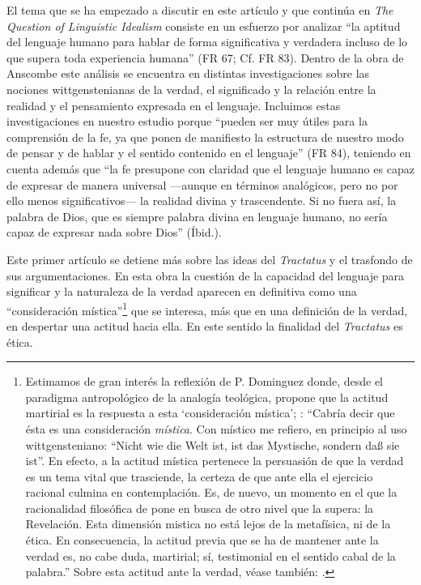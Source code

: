 El tema que se ha empezado a discutir en este artículo y que continúa en \emph{The Question of Linguistic Idealism} consiste en un esfuerzo por analizar \enquote{la aptitud del lenguaje humano para hablar de forma significativa y verdadera incluso de lo que supera toda experiencia humana} (FR 67; Cf. FR 83). Dentro de la obra de Anscombe este análisis se encuentra en distintas investigaciones sobre las nociones wittgenstenianas de la verdad, el significado y la relación entre la realidad y el pensamiento expresada en el lenguaje. 
Incluimos estas investigaciones en nuestro estudio porque \enquote{pueden ser muy útiles para la comprensión de la fe, ya que ponen de manifiesto la estructura de nuestro modo de pensar y de hablar y el sentido contenido en el lenguaje} (FR 84), teniendo en cuenta además que \enquote{la fe presupone con claridad que el lenguaje humano es capaz de expresar de manera universal ---aunque en términos analógicos, pero no por ello menos significativos--- la realidad divina y trascendente. Si no fuera así, la palabra de Dios, que es siempre palabra divina en lenguaje humano, no sería capaz de expresar nada sobre Dios} (Íbid.).

Este primer artículo se detiene más sobre las ideas del \emph{Tractatus} y el trasfondo de sus argumentaciones. En esta obra la cuestión de la capacidad del lenguaje para significar y la naturaleza de la verdad aparecen en definitiva como una ``consideración mística''\footnote{Estimamos de gran interés la reflexión de P. Dominguez donde, desde el paradigma antropológico de la analogía teológica, propone que la actitud martirial es la respuesta a esta `consideración mística'; \Cite[357]{dominguez2009at}: \enquote{Cabría decir que ésta es una consideración \emph{mística}. Con místico me refiero, en principio al uso wittgensteniano: ``Nicht wie die Welt ist, ist das Mystische, sondern daß sie ist''. En efecto, a la actitud mística pertenece la persuasión de que la verdad es un tema vital que trasciende, la certeza de que ante ella el ejercicio racional culmina en contemplación. Es, de nuevo, un momento en el que la racionalidad filosófica de pone en busca de otro nivel que la supera: la Revelación. Esta dimensión mistica no está lejos de la metafísica, ni de la ética. \textelp{} En consecuencia, la actitud previa que se ha de mantener ante la verdad es, no cabe duda, martirial; sí, testimonial en el sentido cabal de la palabra.}  Sobre esta actitud ante la verdad, véase también: \Cite[354-356]{dominguez2009at}.} que se interesa, más que en una definición de la verdad, en despertar una actitud hacia ella. En este sentido la finalidad del \emph{Tractatus} es ética.

